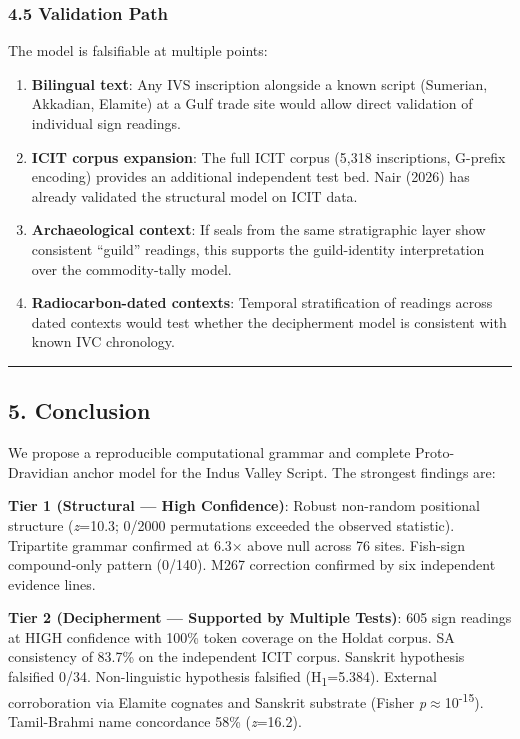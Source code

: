 \documentclass[
  11pt,
]{article}
\providecommand{\tightlist}{%
  \setlength{\itemsep}{0pt}\setlength{\parskip}{0pt}}
\begin{document}
\subsubsection{4.5 Validation Path}\label{validation-path}

The model is falsifiable at multiple points:

\begin{enumerate}
\def\labelenumi{\arabic{enumi}.}
\tightlist
\item
  \textbf{Bilingual text}: Any IVS inscription alongside a known script
  (Sumerian, Akkadian, Elamite) at a Gulf trade site would allow direct
  validation of individual sign readings.
\item
  \textbf{ICIT corpus expansion}: The full ICIT corpus (5,318
  inscriptions, G-prefix encoding) provides an additional independent
  test bed. Nair (2026) has already validated the structural model on
  ICIT data.
\item
  \textbf{Archaeological context}: If seals from the same stratigraphic
  layer show consistent ``guild'' readings, this supports the
  guild-identity interpretation over the commodity-tally model.
\item
  \textbf{Radiocarbon-dated contexts}: Temporal stratification of
  readings across dated contexts would test whether the decipherment
  model is consistent with known IVC chronology.
\end{enumerate}

\begin{center}\rule{0.5\linewidth}{0.5pt}\end{center}

\subsection{5. Conclusion}\label{conclusion}

We propose a reproducible computational grammar and complete
Proto-Dravidian anchor model for the Indus Valley Script. The strongest
findings are:

\textbf{Tier 1 (Structural --- High Confidence)}: Robust non-random
positional structure (\emph{z}=10.3; 0/2000 permutations exceeded the
observed statistic). Tripartite grammar confirmed at 6.3× above null
across 76 sites. Fish-sign compound-only pattern (0/140). M267
correction confirmed by six independent evidence lines.

\textbf{Tier 2 (Decipherment --- Supported by Multiple Tests)}: 605 sign
readings at HIGH confidence with 100\% token coverage on the Holdat
corpus. SA consistency of 83.7\% on the independent ICIT corpus.
Sanskrit hypothesis falsified 0/34. Non-linguistic hypothesis falsified
(H\textsubscript{1}=5.384). External corroboration via Elamite cognates
and Sanskrit substrate (Fisher \emph{p}$\approx$10\textsuperscript{-15}).
Tamil-Brahmi name concordance 58\% (\emph{z}=16.2).
\end{document}
